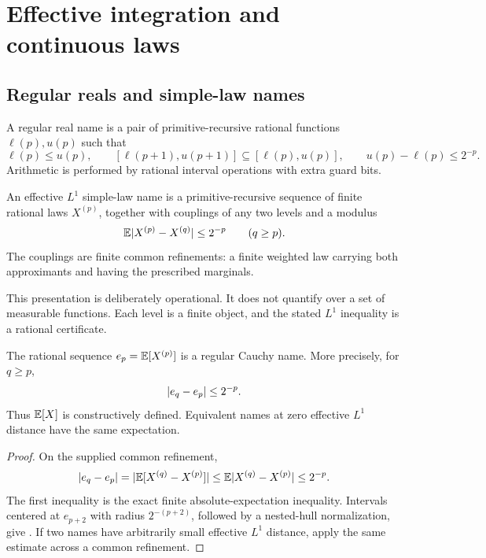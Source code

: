 \section{Effective integration and continuous laws}\label{sec:integration}

\subsection{Regular reals and simple-law names}

\begin{definition}\label{def:regular}
A regular real name is a pair of primitive-recursive rational functions
\(\ell(p),u(p)\) such that
\[
 \ell(p)\le u(p),\qquad
 [\ell(p+1),u(p+1)]\subseteq[\ell(p),u(p)],\qquad
 u(p)-\ell(p)\le2^{-p}.
\]
Arithmetic is performed by rational interval operations with extra guard bits.
\end{definition}

\begin{definition}\label{def:simple-name}
An effective \(L^1\) simple-law name is a primitive-recursive sequence of
finite rational laws \(X^{(p)}\), together with couplings of any two levels and
a modulus
\[
 \mathbb E\lvert X^{(p)}-X^{(q)}\rvert\le2^{-p}
 \qquad(q\ge p).
\]
The couplings are finite common refinements: a finite weighted law carrying
both approximants and having the prescribed marginals.
\end{definition}

This presentation is deliberately operational.  It does not quantify over a
set of measurable functions.  Each level is a finite object, and the stated
\(L^1\) inequality is a rational certificate.

\begin{theorem}
\label{thm:l1-expect}
The rational sequence \(e_p=\mathbb E[X^{(p)}]\) is a regular Cauchy name.  More
precisely, for \(q\ge p\),
\[
 \lvert e_q-e_p\rvert\le2^{-p}.
\]
Thus \(\mathbb E[X]\) is constructively defined.  Equivalent names at zero effective
\(L^1\) distance have the same expectation.
\end{theorem}

\begin{proof}
On the supplied common refinement,
\[
 \lvert e_q-e_p\rvert
 =\lvert \mathbb E[X^{(q)}-X^{(p)}]\rvert
 \le\mathbb E\lvert X^{(q)}-X^{(p)}\rvert
 \le2^{-p}.
\]
The first inequality is the exact finite absolute-expectation inequality.
Intervals centered at \(e_{p+2}\) with radius \(2^{-(p+2)}\), followed by a
nested-hull normalization, give .  If two names have
arbitrarily small effective \(L^1\) distance, apply the same estimate across a
common refinement.
\end{proof}

